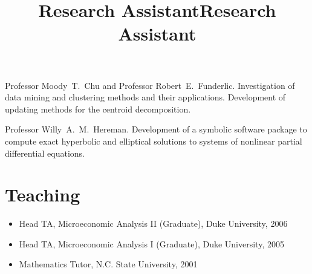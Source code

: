 \documentclass[overlapped,line,final,11pt,letterpaper]{res}
\begin{document}
\begin{resume}
\title{Research Assistant}
\begin{position}
  Professor Moody\ T.\ Chu and Professor Robert\ E.\ Funderlic.
  Investigation of data mining and clustering methods and their
  applications. Development of updating methods for the centroid
  decomposition.
\end{position}

\title{Research Assistant}
\begin{position}
  Professor Willy\ A.\ M.\ Hereman. Development of a symbolic software
  package to compute exact hyperbolic and elliptical solutions to
  systems of nonlinear partial differential equations.
\end{position}


\section{\bf Teaching}

\begin{itemize}
\item Head TA, Microeconomic Analysis II (Graduate), Duke University, 2006
\item Head TA, Microeconomic Analysis I (Graduate), Duke University, 2005
\item Mathematics Tutor, N.C. State University, 2001
\end{itemize}


%



\end{resume}
\end{document}
